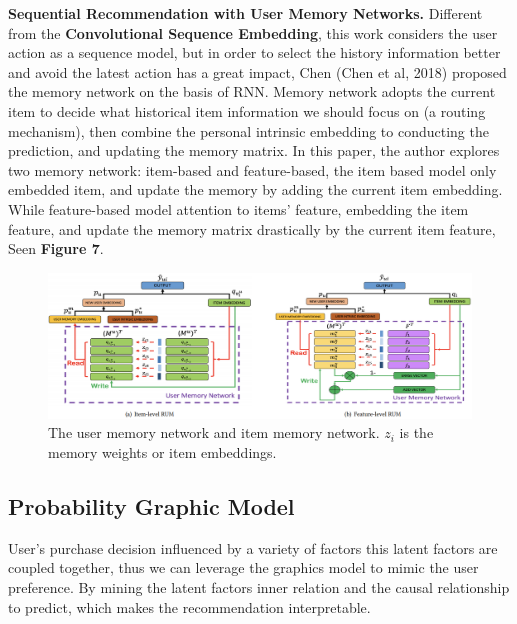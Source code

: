 \documentclass[10pt,twocolumn,letterpaper]{article}
\begin{document}
{\bf Sequential Recommendation with User Memory Networks.} Different from the {\bf Convolutional Sequence Embedding}, this work considers the user action as a sequence model, but in order to select the history information better and avoid the latest action has a great impact, Chen (Chen et al, 2018) proposed the memory network on the basis of RNN. Memory network adopts the current item to decide what historical item information we should focus on (a routing mechanism), then combine the personal intrinsic embedding to conducting the prediction, and updating the memory matrix. In this paper, the author explores two memory network: item-based and feature-based, the item based model only embedded item, and update the memory by adding the current item embedding. While feature-based model attention to items' feature, embedding the item feature, and update the memory matrix drastically by the current item feature, Seen {\bf Figure 7}.  
\begin{figure}
	\begin{center}
		\includegraphics[width=.9\linewidth]{memory.png}
	\end{center}
	\caption{The user memory network and item memory network. $z_i$ is the memory weights or item embeddings.}
	\label{fig:short}
\end{figure}

\subsection{Probability Graphic Model}
User's purchase decision influenced by a variety of factors this latent factors are coupled together, thus we can leverage the graphics model to mimic the user preference. By mining the latent factors inner relation and the causal relationship to predict, which makes the recommendation interpretable. 
\end{document}
